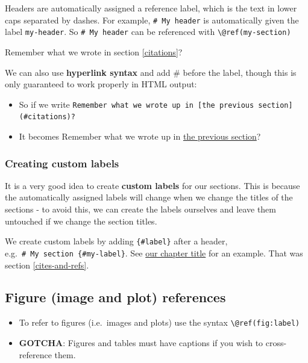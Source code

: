 \documentclass[a4paper, twoside]{templates/ociamthesis}
\providecommand{\tightlist}{%
  \setlength{\itemsep}{0pt}\setlength{\parskip}{0pt}}
\begin{document}
Headers are automatically assigned a reference label, which is the text in lower caps separated by dashes. For example, \texttt{\#\ My\ header} is automatically given the label \texttt{my-header}. So \texttt{\#\ My\ header} can be referenced with \texttt{\textbackslash{}@ref(my-section)}

Remember what we wrote in section \ref{citations}?

We can also use \textbf{hyperlink syntax} and add \# before the label, though this is only guaranteed to work properly in HTML output:

\begin{itemize}
\tightlist
\item
  So if we write \texttt{Remember\ what\ we\ wrote\ up\ in\ {[}the\ previous\ section{]}(\#citations)?}
\item
  It becomes Remember what we wrote up in \protect\hyperlink{citations}{the previous section}?
\end{itemize}

\hypertarget{creating-custom-labels}{%
\subsubsection{Creating custom labels}\label{creating-custom-labels}}

It is a very good idea to create \textbf{custom labels} for our sections. This is because the automatically assigned labels will change when we change the titles of the sections - to avoid this, we can create the labels ourselves and leave them untouched if we change the section titles.

We create custom labels by adding \texttt{\{\#label\}} after a header, e.g.~\texttt{\#\ My\ section\ \{\#my-label\}}.
See \protect\hyperlink{cites-and-refs}{our chapter title} for an example. That was section \ref{cites-and-refs}.

\hypertarget{figure-image-and-plot-references}{%
\subsection{Figure (image and plot) references}\label{figure-image-and-plot-references}}

\begin{itemize}
\tightlist
\item
  To refer to figures (i.e.~images and plots) use the syntax \texttt{\textbackslash{}@ref(fig:label)}
\item
  \textbf{GOTCHA}: Figures and tables must have captions if you wish to cross-reference them.
\end{itemize}
\end{document}
